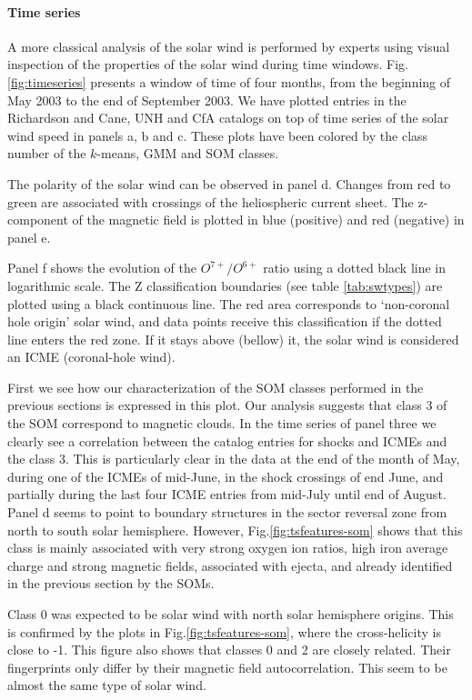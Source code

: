 \paragraph{Time series}
A more classical analysis of the solar wind is performed by experts using visual inspection of the properties of the solar wind during time windows. Fig.\ref{fig:timeseries} presents a window of time of four months, from the beginning of May 2003 to the end of September 2003. We have plotted entries in the Richardson and Cane, UNH and CfA catalogs on top of time series of the solar wind speed in panels a, b and c. These plots have been colored by the class number of the $k$-means, GMM and SOM classes.

The polarity of the solar wind can be observed in panel d. Changes from red to green are associated with crossings of the heliospheric current sheet. The z-component of the magnetic field is plotted in blue (positive) and red (negative) in panel e.

Panel f shows the evolution of the $O^{7+}/O^{6+}$ ratio using a dotted black line in logarithmic scale. The Z classification boundaries (see table \ref{tab:swtypes}) are plotted using a black continuous line. The red area corresponds to `non-coronal hole origin' solar wind, and data points receive this classification if the dotted line enters the red zone. If it stays above (bellow) it, the solar wind is considered an ICME (coronal-hole wind).

First we see how our characterization of the SOM classes performed in the previous sections is expressed in this plot. Our analysis suggests that class 3 of the SOM correspond to magnetic clouds. In the time series of panel three we clearly see a correlation between the catalog entries for shocks and ICMEs and the class 3. This is particularly clear in the data at the end of the month of May, during one of the ICMEs of mid-June, in the shock crossings of end June, and partially during the last four ICME entries from mid-July until end of August. Panel d seems to point to boundary structures in the sector reversal zone from north to south solar hemisphere. However, Fig.\ref{fig:tsfeatures-som} shows that this class is mainly associated with very strong oxygen ion ratios, high iron average charge and strong magnetic fields, associated with ejecta, and already identified in the previous section by the SOMs.

Class 0 was expected to be solar wind with north solar hemisphere origins. This is confirmed by the plots in Fig.\ref{fig:tsfeatures-som}, where the cross-helicity is close to -1. This figure also shows that classes 0 and 2 are closely related. Their fingerprints only differ by their magnetic field autocorrelation. This seem to be almost the same type of solar wind.

